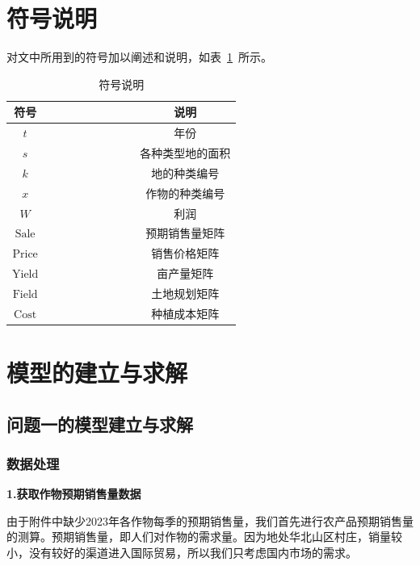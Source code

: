 \documentclass{cumcmthesis}
\begin{document}
\section{符号说明}

对文中所用到的符号加以阐述和说明，如表~\ref{tab001}~所示。
\begin{table}[!htbp]
	\caption{符号说明}\label{tab001} \centering
	\begin{tabular}{cccccccccc}
		\toprule[1.5pt]
		符号 &  &  &  &  & & & &  & 说明\\
		\midrule[1pt]
		$t$ &  &  &  &  &  & & & & 年份\\
		$s$ &  &  &  &  &  &  & & & 各种类型地的面积\\
		$k$ &  &  &  &  &  &  & & & 地的种类编号\\
		$x$ &  &  &  &  &  &  & & & 作物的种类编号\\
		$W$ &  &  &  &  &  &  & & & 利润\\
		$\text{Sale}$ &  &  &  &  &  &  & & & 预期销售量矩阵\\
		$\text{Price}$ &  &  &  &  &  &  & & & 销售价格矩阵\\
		$\text{Yield}$ &  &  &  &  &  &  & & & 亩产量矩阵\\
		$\text{Field}$ &  &  &  &  &  &  & & & 土地规划矩阵\\
		$\text{Cost}$ &  &  &  &  &  &  & & & 种植成本矩阵\\
		

		\bottomrule[1.5pt]
	\end{tabular}
\end{table}

\section{模型的建立与求解}

\subsection{问题一的模型建立与求解}

\subsubsection{数据处理}
\textbf{1.获取作物预期销售量数据}

由于附件中缺少2023年各作物每季的预期销售量，我们首先进行农产品预期销售量的测算。预期销售量，即人们对作物的需求量。因为地处华北山区村庄，销量较小，没有较好的渠道进入国际贸易，所以我们只考虑国内市场的需求。
\end{document}
